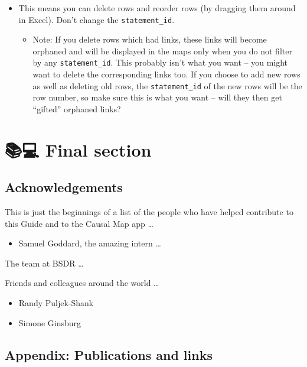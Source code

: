 \documentclass[
]{book}
\providecommand{\tightlist}{%
  \setlength{\itemsep}{0pt}\setlength{\parskip}{0pt}}
\begin{document}
\begin{itemize}
\tightlist
\item
  This means you can delete rows and reorder rows (by dragging them around in Excel). Don't change the \texttt{statement\_id}.

  \begin{itemize}
  \tightlist
  \item
    Note: If you delete rows which had links, these links will become orphaned and will be displayed in the maps only when you do not filter by any \texttt{statement\_id}. This probably isn't what you want -- you might want to delete the corresponding links too. If you choose to add new rows as well as deleting old rows, the \texttt{statement\_id} of the new rows will be the row number, so make sure this is what you want -- will they then get ``gifted'' orphaned links?
  \end{itemize}
\end{itemize}

\hypertarget{part-final-section}{%
\part{📚💻 Final section}\label{part-final-section}}

\hypertarget{acknowledgements}{%
\chapter{Acknowledgements}\label{acknowledgements}}

This is just the beginnings of a list of the people who have helped contribute to this Guide and to the Causal Map app \ldots{}

\begin{itemize}
\tightlist
\item
  Samuel Goddard, the amazing intern \ldots{}
\end{itemize}

The team at BSDR \ldots{}

Friends and colleagues around the world \ldots{}

\begin{itemize}
\item
  Randy Puljek-Shank
\item
  Simone Ginsburg
\end{itemize}

\hypertarget{appendix-publications-and-links}{%
\chapter{Appendix: Publications and links}\label{appendix-publications-and-links}}
\end{document}
